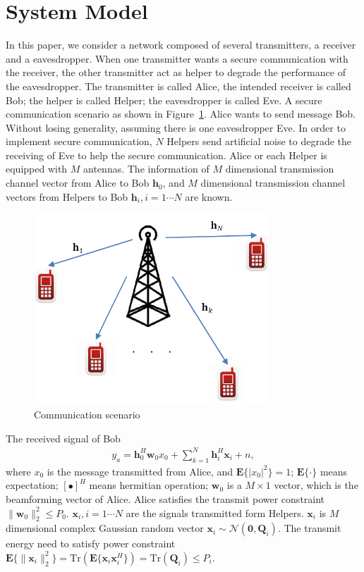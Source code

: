 \documentclass[conference]{IEEEtran}
\begin{document}
\section{System Model} \label{sec:system model}
In this paper, we consider a network composed of several transmitters, a receiver and a eavesdropper. When one transmitter wants a secure communication with the receiver, the other transmitter act as helper to degrade the performance of the eavesdropper. The transmitter is called Alice, the intended receiver is called Bob; the helper is called Helper; the eavesdropper is called Eve. A secure communication scenario as shown in Figure~\ref{fig:system}. Alice wants to send message Bob. Without losing generality, assuming there is one eavesdropper Eve. In order to implement secure communication, $N$ Helpers send artificial noise to degrade the receiving of Eve to help the secure communication.  Alice or each Helper is equipped with $M$ antennas. The information of $M$ dimensional transmission channel vector from Alice to Bob $\mathbf{h}_0$, and  $M$ dimensional transmission channel vectors from Helpers to Bob $\mathbf{h}_i, i = 1 \cdots N$ are known.
\begin{figure}[htbp]
	\centering
	\includegraphics[width=8.8cm]{system.png} %
	\caption{Communication scenario}
	\label{fig:system}
\end{figure}
The received signal of Bob
\begin{eqnarray}
y_a =\mathbf{h}_0^{H}\mathbf{w}_0x_0 + \sum_{k=1}^N \mathbf{h}_{i}^H\mathbf{x}_{i} + n,
\end{eqnarray}
where $x_0$ is the message transmitted from Alice, and $\mathbf{E}\{|x_0|^2\} = 1$; $\mathbf{E}\{\cdot\}$ means expectation; $[\bullet]^H$ means hermitian operation; $\mathbf{w}_{0}$ is a $M \times 1$ vector, which is the beamforming vector of Alice. Alice satisfies the transmit power constraint $\|\mathbf{w}_0\|_2^2 \leq P_0$. $\mathbf{x}_i, i = 1 \cdots N $ are the signals transmitted form Helpers. $\mathbf{x}_i$ is $M$ dimensional  complex Gaussian random vector $\mathbf{x}_i \sim \mathcal{N}(\mathbf{0}, \mathbf{Q}_i)$. The transmit energy need to satisfy power constraint $\mathbf{E}\{\|\mathbf{x}_i\|_2^2\}  = \mathrm{Tr}(\mathbf{E}\{\mathbf{x}_i\mathbf{x}_i^H\} )= \mathrm{Tr}(\mathbf{Q}_i) \leq P_i$. 
\end{document}

